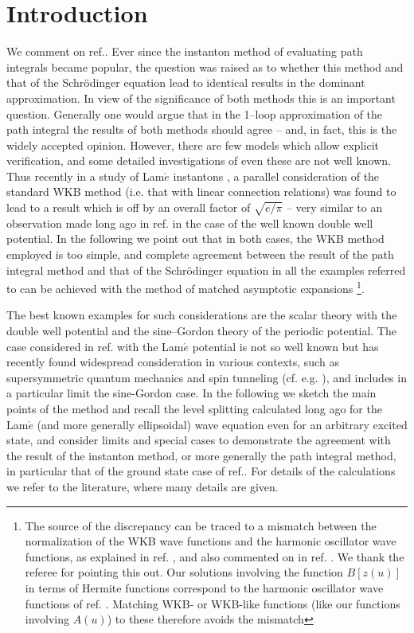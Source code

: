 \documentclass[a4paper,12pt,a4]{article}
\begin{document}
\section{Introduction}
We comment on ref.\cite{1}.
Ever since the instanton method of evaluating path 
integrals became popular, the question was raised
as to whether this method and that of the Schr\"odinger equation
lead to identical results in the dominant
approximation.  In view of the significance of
both methods this is an important question. Generally
one would argue
that in the 1--loop approximation of the
path integral the results of both methods
should agree -- and, in fact,
this is the widely accepted opinion.  However, there are
few models which allow explicit verification, and some detailed
investigations of even
these are not well known.  Thus recently in a study of Lam${\acute e}$
 instantons \cite{1}, a parallel consideration of the
standard WKB method (i.e. that with linear connection
relations) was found to lead to a  result which is
off by an overall factor of $\sqrt{e/\pi}$  --
very similar to an observation made long ago in ref.\cite{2} in the case of
the well known double well potential.  In the following we point
out that in both cases, the WKB method  employed is too
simple, and complete agreement between
the result of the path integral method and that of
the Schr\"odinger equation
in all the examples referred to can be achieved with the
method of matched asymptotic expansions
 \footnote{The source of the discrepancy can be traced to a
mismatch between the normalization of the WKB
wave functions and the harmonic oscillator wave functions, as
explained in ref. \cite{3}, 
and also commented on
in ref. \cite{4}.
We thank the referee for pointing this out.
Our solutions involving the function $B[z(u)]$
in terms of Hermite functions
correspond to the harmonic oscillator wave functions
of ref. \cite{3}. Matching WKB- or WKB-like functions
(like our functions involving $A(u)$)
to these therefore avoids the mismatch}.

The best known examples
for such considerations are the scalar theory with the double well
potential and the
sine--Gordon theory of the periodic potential.  The case considered
in ref.\cite{1} with the Lam${\acute e}$ potential
 is not so well known but has recently found
widespread consideration in various contexts, such as
supersymmetric quantum mechanics \cite{5}
and spin tunneling (cf. e.g. \cite{6}), and includes in a particular limit
the sine-Gordon case.  In the following
 we sketch the main points of the method and 
recall the level splitting calculated long ago for the
Lam${\acute e}$ (and more generally ellipsoidal) wave
equation \cite{7} even for an arbitrary
excited state,  and consider limits and special cases to
demonstrate the agreement with the result of the
instanton method, or more generally the
path integral method,  in particular that 
of the ground state case of ref.\cite{1}.
For details of the calculations we refer to the
literature, where many details are given.
\end{document}
